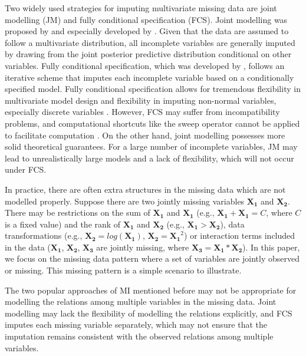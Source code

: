 	Two widely used strategies for imputing multivariate missing data are joint modelling (JM) and fully conditional specification (FCS). Joint modelling was proposed by \citet{RubinD1987} and especially developed by \citet{schafer1997analysis}. Given that the data are assumed to follow a multivariate distribution, all incomplete variables are generally imputed by drawing from the joint posterior predictive distribution conditional on other variables. Fully conditional specification, which was developed by \citet{van1999multiple}, follows an iterative scheme that imputes each incomplete variable based on a conditionally specified model. Fully conditional specification allows for tremendous flexibility in multivariate model design and flexibility in imputing non-normal variables, especially discrete variables \citep{van2007multiple, goldstein2014fitting}. However, FCS may suffer from incompatibility problems, and computational shortcuts like the sweep operator cannot be applied to facilitate computation \citep{Buuren2018}. On the other hand, joint modelling possesses more solid theoretical guarantees. For a large number of incomplete variables, JM may lead to unrealistically large models and a lack of flexibility, which will not occur under FCS.  
	
	In practice, there are often extra structures in the missing data which are not modelled properly. Suppose there are two jointly missing variables $\boldsymbol{X_1}$ and $\boldsymbol{X_2}$. There may be restrictions on the sum of $\boldsymbol{X_1}$ and $\boldsymbol{X_1}$ (e.g., $\boldsymbol{X_1} + \boldsymbol{X_1} = C$, where $C$ is a fixed value) and the rank of $\boldsymbol{X_1}$ and $\boldsymbol{X_2}$ (e.g., $\boldsymbol{X_1} > \boldsymbol{X_2}$), data transformations (e.g., $\boldsymbol{X_2} = log(\boldsymbol{X_1})$, $\boldsymbol{X_2} = \boldsymbol{X_1}^2$) or interaction terms included in the data ($\boldsymbol{X_1}$, $\boldsymbol{X_2}$, $\boldsymbol{X_3}$ are jointly missing, where $\boldsymbol{X_3} = \boldsymbol{X_1} * \boldsymbol{X_2}$). In this paper, we focus on the missing data pattern where a set of variables are jointly observed or missing. This missing pattern is a simple scenario to illustrate.  
	
	The two popular approaches of MI mentioned before may not be appropriate for modelling the relations among multiple variables in the missing data. Joint modelling may lack the flexibility of modelling the relations explicitly, and FCS imputes each missing variable separately, which may not ensure that the imputation remains consistent with the observed relations among multiple variables. 
	

